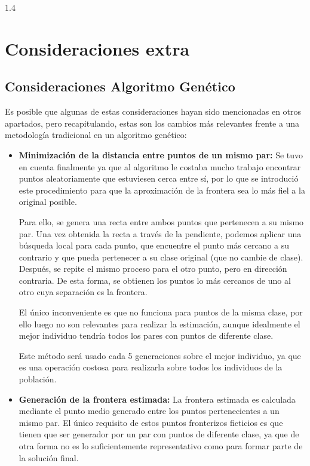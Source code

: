 \documentclass{article}
\begin{document}
\begin{spacing}{1.4}
\section{Consideraciones extra}
\subsection{Consideraciones Algoritmo Genético}

Es posible que algunas de estas consideraciones hayan sido mencionadas en otros apartados, pero recapitulando,
estas son los cambios más relevantes frente a una metodología tradicional en un algoritmo genético:

\begin{itemize}
  \item \textbf{Minimización de la distancia entre puntos de un mismo par:} Se tuvo en cuenta finalmente ya que
  al algoritmo le costaba mucho trabajo encontrar puntos aleatoriamente que estuviesen cerca entre sí, por lo que 
  se introdució este procedimiento para que la aproximación de la frontera sea lo más fiel a la original posible.
  
  Para ello, se genera una recta entre ambos puntos que pertenecen a su mismo par. Una vez obtenida la recta a través 
  de la pendiente, podemos aplicar una búsqueda local para cada punto, que encuentre el punto más cercano a su contrario 
  y que pueda pertenecer a su clase original (que no cambie de clase). Después, se repite el mismo proceso para el otro punto,
  pero en dirección contraria. De esta forma, se obtienen los puntos lo más cercanos de uno al otro cuya separación es la frontera. 

  El único inconveniente es que no funciona para puntos de la misma clase, por ello luego no son relevantes para realizar la estimación,
  aunque idealmente el mejor individuo tendría todos los pares con puntos de diferente clase. 

  Este método será usado cada 5 generaciones sobre el mejor individuo, ya que es una operación costosa para realizarla sobre todos los individuos
  de la población.

  \item \textbf{Generación de la frontera estimada:} La frontera estimada es calculada mediante el punto medio generado entre los puntos 
  pertenecientes a un mismo par. El único requisito de estos puntos fronterizos ficticios es que tienen que ser generador por un par con puntos
  de diferente clase, ya que de otra forma no es lo suficientemente representativo como para formar parte de la solución final. 


\end{itemize}
\end{spacing}
\end{document}
